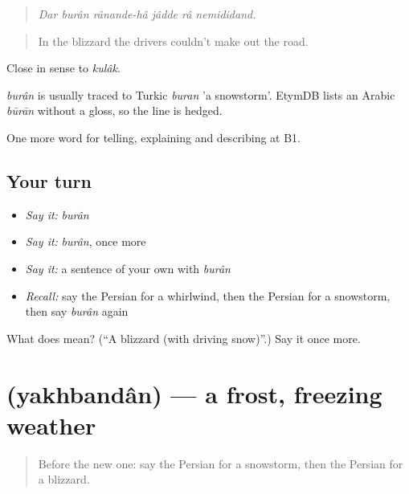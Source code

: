 \begin{quote}
\emph{Dar burân rânande-hâ jâdde râ nemididand.}
\end{quote}

\begin{quote}
In the blizzard the drivers couldn't make out the road.
\end{quote}

Close in sense to \emph{kulâk}.

\begin{cousinweb}
\emph{burân} is usually traced to Turkic \emph{buran} 'a snowstorm'. EtymDB lists an Arabic \emph{būrān} without a gloss, so the line is hedged.
\end{cousinweb}

\begin{grammarlens}[title={What you've built}]
One more word for telling, explaining and describing at B1.
\end{grammarlens}

\subsection*{Your turn}
\begin{itemize}
\raggedright
  \item \emph{Say it:} \emph{burân}
  \item \emph{Say it:} \emph{burân}, once more
  \item \emph{Say it:} a sentence of your own with \emph{burân}
  \item \emph{Recall:} say the Persian for a whirlwind, then the Persian for a snowstorm, then say \emph{burân} again
\end{itemize}

\begin{tcolorbox}[breakable,colback=teal!4,colframe=teal!35!black,title={Before you move on}]
What does  mean? (\textquotedblleft{}A blizzard (with driving snow)\textquotedblright{}.) Say it once more.
\end{tcolorbox}
\section[\texorpdfstring{\fa{یخبندان} (yakhbandân)}{یخبندان (yakhbandân)}]{ (yakhbandân) — a frost, freezing weather}

\label{lesson:FA-C476-yakhbandan}



\begin{quote}
Before the new one: say the Persian for a snowstorm, then the Persian for a blizzard.
\end{quote}

